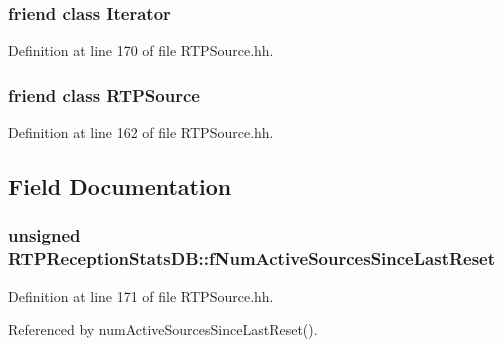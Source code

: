 \subsubsection[{Iterator}]{\setlength{\rightskip}{0pt plus 5cm}friend class {\bf Iterator}\hspace{0.3cm}{\ttfamily [friend]}}\label{classRTPReceptionStatsDB_a9830fc407400559db7e7783cc10a9394}


Definition at line 170 of file R\+T\+P\+Source.\+hh.

\subsubsection[{R\+T\+P\+Source}]{\setlength{\rightskip}{0pt plus 5cm}friend class {\bf R\+T\+P\+Source}\hspace{0.3cm}{\ttfamily [friend]}}\label{classRTPReceptionStatsDB_adcde3b4528e1ae670da349b6800aa224}


Definition at line 162 of file R\+T\+P\+Source.\+hh.



\subsection{Field Documentation}
\subsubsection[{f\+Num\+Active\+Sources\+Since\+Last\+Reset}]{\setlength{\rightskip}{0pt plus 5cm}unsigned R\+T\+P\+Reception\+Stats\+D\+B\+::f\+Num\+Active\+Sources\+Since\+Last\+Reset\hspace{0.3cm}{\ttfamily [protected]}}\label{classRTPReceptionStatsDB_ab538675a884a49a1ee4975617df3acd3}


Definition at line 171 of file R\+T\+P\+Source.\+hh.



Referenced by num\+Active\+Sources\+Since\+Last\+Reset().

